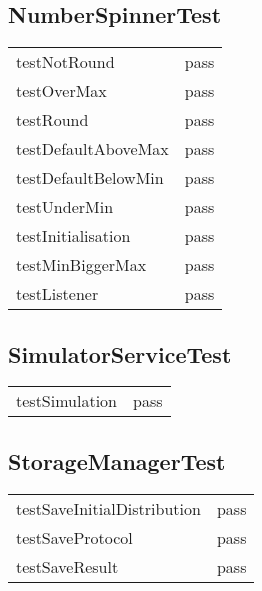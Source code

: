\subsection*{NumberSpinnerTest}
\begin{tabular}{l|l}
testNotRound               & pass \\
testOverMax                & pass \\
testRound                    & pass \\
testDefaultAboveMax  & pass \\
testDefaultBelowMin    & pass \\
testUnderMin               & pass \\
testInitialisation           & pass \\
testMinBiggerMax        & pass \\
testListener                 & pass \\
\end{tabular}

\subsection*{SimulatorServiceTest}
\begin{tabular}{l|l}
testSimulation & pass \\
\end{tabular}

\subsection*{StorageManagerTest}
\begin{tabular}{l|l}
testSaveInitialDistribution & pass \\
testSaveProtocol              & pass \\
testSaveResult                 & pass \\
\end{tabular}